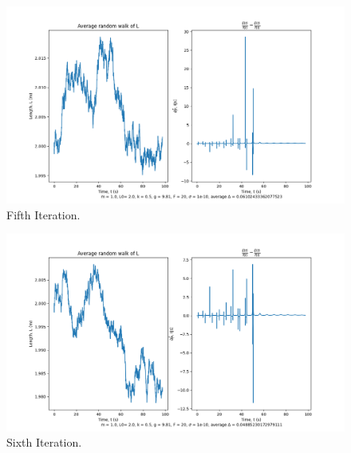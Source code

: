 \documentclass[10pt, twocolumn]{article}
\begin{document}
\begin{figure}[H]
    \centering
    \includegraphics[width = \columnwidth]{Projects/ForcedSimplePendulum/Plots/simplified m = 1.0, L0= 2.0, k = 0.5, g = 9.81, F = 20, sigma = 1e-10, run number 4.png}
    \caption{Fifth Iteration.}
    \label{fig:enter-label}
\end{figure}

\begin{figure}[H]
    \centering
    \includegraphics[width = \columnwidth]{Projects/ForcedSimplePendulum/Plots/simplified m = 1.0, L0= 2.0, k = 0.5, g = 9.81, F = 20, sigma = 1e-10, run number 5.png}
    \caption{Sixth Iteration.}
    \label{fig:enter-label}
\end{figure}
\end{document}
